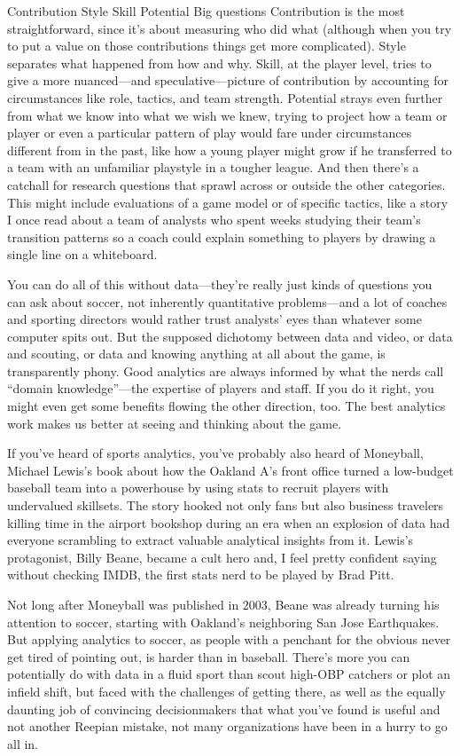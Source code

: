 Contribution
Style
Skill
Potential
Big questions
Contribution is the most straightforward, since it’s about measuring who did what (although when you try to put a value on those contributions things get more complicated). Style separates what happened from how and why. Skill, at the player level, tries to give a more nuanced—and speculative—picture of contribution by accounting for circumstances like role, tactics, and team strength. Potential strays even further from what we know into what we wish we knew, trying to project how a team or player or even a particular pattern of play would fare under circumstances different from in the past, like how a young player might grow if he transferred to a team with an unfamiliar playstyle in a tougher league. And then there’s a catchall for research questions that sprawl across or outside the other categories. This might include evaluations of a game model or of specific tactics, like a story I once read about a team of analysts who spent weeks studying their team’s transition patterns so a coach could explain something to players by drawing a single line on a whiteboard.

You can do all of this without data—they’re really just kinds of questions you can ask about soccer, not inherently quantitative problems—and a lot of coaches and sporting directors would rather trust analysts’ eyes than whatever some computer spits out. But the supposed dichotomy between data and video, or data and scouting, or data and knowing anything at all about the game, is transparently phony. Good analytics are always informed by what the nerds call “domain knowledge”—the expertise of players and staff. If you do it right, you might even get some benefits flowing the other direction, too. The best analytics work makes us better at seeing and thinking about the game.

If you’ve heard of sports analytics, you’ve probably also heard of Moneyball, Michael Lewis’s book about how the Oakland A’s front office turned a low-budget baseball team into a powerhouse by using stats to recruit players with undervalued skillsets. The story hooked not only fans but also business travelers killing time in the airport bookshop during an era when an explosion of data had everyone scrambling to extract valuable analytical insights from it. Lewis’s protagonist, Billy Beane, became a cult hero and, I feel pretty confident saying without checking IMDB, the first stats nerd to be played by Brad Pitt.

Not long after Moneyball was published in 2003, Beane was already turning his attention to soccer, starting with Oakland’s neighboring San Jose Earthquakes. But applying analytics to soccer, as people with a penchant for the obvious never get tired of pointing out, is harder than in baseball. There’s more you can potentially do with data in a fluid sport than scout high-OBP catchers or plot an infield shift, but faced with the challenges of getting there, as well as the equally daunting job of convincing decisionmakers that what you’ve found is useful and not another Reepian mistake, not many organizations have been in a hurry to go all in.


